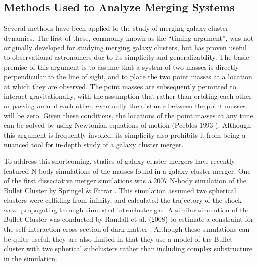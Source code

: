 \documentclass[12 pt]{article}
\begin{document}
\subsection{Methods Used to Analyze Merging Systems}

Several methods have been applied to the study of merging galaxy cluster dynamics. The first of these, commonly known as the “timing argument”, was not originally developed for studying merging galaxy clusters, but has proven useful to observational astronomers due to its simplicity and generalizability. The basic premise of this argument is to assume that a system of two masses is directly perpendicular to the line of sight, and to place the two point masses at a location at which they are observed. The point masses are subsequently permitted to interact gravitationally, with the assumption that rather than orbiting each other or passing around each other, eventually the distance between the point masses will be zero. Given these conditions, the locations of the point masses at any time can be solved by using Newtonian equations of motion (Peebles 1993 \cite{Peebles93}). Although this argument is frequently invoked, its simplicity also prohibits it from being a nuanced tool for in-depth study of a galaxy cluster merger. 

To address this shortcoming, studies of galaxy cluster mergers have recently featured N-body simulations of the masses found in a galaxy cluster merger. One of the first dissociative merger simulations was a 2007 N-body simulation of the Bullet Cluster by Springel \& Farrar \cite{Springel07}. This simulation assumed two spherical clusters were colliding from infinity, and calculated the trajectory of the shock wave propagating through simulated intracluster gas. A similar simulation of the Bullet Cluster was conducted by Randall et al. (2008) to estimate a constraint for the self-interaction cross-section of dark matter \cite{Randall08}. Although these simulations can be quite useful, they are also limited in that they use a model of the Bullet cluster with two spherical subclusters rather than including complex substructure in the simulation.
\end{document}
